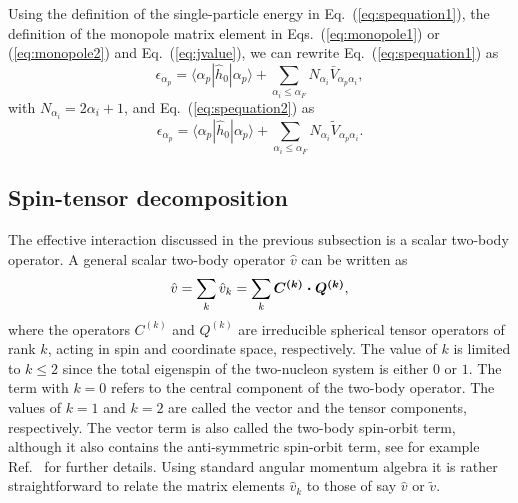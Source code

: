 \documentclass[preprint,12pt,authoryear]{elsarticle}
\begin{document}
Using the definition of the single-particle energy in
Eq.~(\ref{eq:spequation1}), the definition of the monopole matrix
element in Eqs.~(\ref{eq:monopole1}) or (\ref{eq:monopole2}) and Eq.~(\ref{eq:jvalue}), we can rewrite
Eq.~(\ref{eq:spequation1}) as
\begin{equation}
\epsilon_{\alpha_{p}}=\langle \alpha_p|\hat{h}_0|\alpha_p\rangle+\sum_{\alpha_i\le \alpha_F}N_{\alpha_i}\bar{V}_{\alpha_p\alpha_i},
\label{eq:spmono1}
\end{equation}
with $N_{\alpha_i}=2\alpha_i+1$, and Eq.~(\ref{eq:spequation2}) as 
\begin{equation}
\epsilon_{\alpha_{p}}=\langle \alpha_p|\hat{h}_0|\alpha_p\rangle+\sum_{\alpha_i\le \alpha_F}N_{\alpha_i}\tilde{V}_{\alpha_p\alpha_i}.
\label{eq:spmono2}
\end{equation}




\subsection{Spin-tensor decomposition}\label{subsec:spintensor}

The effective interaction discussed in the previous subsection is a
scalar two-body operator. A general scalar two-body operator
$\hat{v}$ can be written as
\begin{equation}
\hat{v} = \sum_{k} \hat{v}_{k} = \sum_{k} \mbox{\boldmath $C^{(k)}\cdot
Q^{(k)}$},
\end{equation}
where the operators \mbox{\boldmath $C^{(k)}$} and
\mbox{\boldmath $Q^{(k)}$} are irreducible spherical tensor
operators of rank $k$, acting in spin and coordinate space,
respectively. The value of $k$ is limited to $k\le 2$ since the total eigenspin of the two-nucleon
system is either $0$ or $1$. The term with
$k=0$ refers to the central component of the two-body
operator.
The values of $k=1$ and $k=2$ are called
the vector and the tensor components, respectively. The vector term is also called the two-body spin-orbit term, although it
also contains the anti-symmetric spin-orbit term, see for example Ref.~\cite{conze1973} for further details.
Using standard angular momentum algebra it is rather straightforward to relate the matrix elements  $\hat{v}_{k}$ to
those of say $\hat{v}$ or $\tilde{v}$. 
\end{document}
